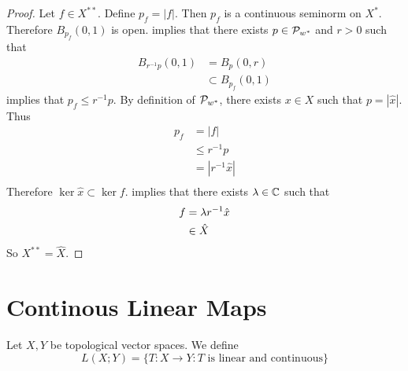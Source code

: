 \documentclass{book}
\begin{document}
	\begin{proof}
		Let $f \in X^{**}$. Define $p_{f} = |f|$. Then $p_f$ is a continuous seminorm on $X^*$. Therefore $B_{p_f}(0,1)$ is open.  implies that there exists $p \in \mathcal{P}_{w^*}$ and $r >0$ such that 
		\begin{align*}
			B_{r^{-1}p}(0,1)
			& = B_{p}(0,r) \\
			& \subset B_{p_f}(0,1)
		\end{align*}
		 implies that $p_f \leq r^{-1}p$. By definition of $\mathcal{P}_{w^*}$, there exists $x \in X$ such that $p = |\hat{x}|$. Thus
		\begin{align*}
			p_f
			& = |f| \\
			& \leq r^{-1}p \\
			& = |r^{-1}\hat{x}| \\
		\end{align*} 
	Therefore $\ker \hat{x} \subset \ker f$.  implies that there exists $\lambda \in \mathbb{C}$ such that 
	\begin{align*}
		f 
		& = \lambda r^{-1}\hat{x} \\
		& \in \hat{X}
	\end{align*}
	So $X^{**} = \hat{X}$.
	\end{proof}




























\newpage
\section{Continous Linear Maps}


\begin{defn}
	Let $X,Y$ be topological vector spaces. We define 
	$$L(X; Y) = \{T:X \rightarrow Y: T \text{ is linear and continuous}\}$$
\end{defn}
\end{document}
